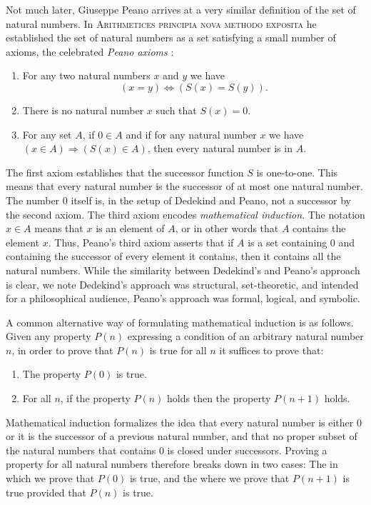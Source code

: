 Not much later, Giuseppe Peano arrives at a very similar definition of the set of natural numbers. In \textsc{Arithmetices principia nova methodo exposita} he established the set of natural numbers as a set satisfying a small number of axioms, the celebrated \emph{Peano axioms} \cite{peano1889}:
\begin{enumerate}
\item For any two natural numbers $x$ and $y$ we have
  \begin{equation*}
    (x=y)\Leftrightarrow (S(x)=S(y)).
  \end{equation*}
\item There is no natural number $x$ such that $S(x)=0$.
\item For any set $A$, if $0\in A$ and if for any natural number $x$ we have $(x\in A) \Rightarrow (S(x)\in A)$, then every natural number is in $A$.
\end{enumerate}
The first axiom establishes that the successor function $S$ is one-to-one. This means that every natural number is the successor of at most one natural number. The number $0$ itself is, in the setup of Dedekind and Peano, not a successor by the second axiom. The third axiom encodes \emph{mathematical induction}. The notation $x\in A$ means that $x$ is an element of $A$, or in other words that $A$ contains the element $x$. Thus, Peano's third axiom asserts that if $A$ is a set containing $0$ and containing the successor of every element it contains, then it contains all the natural numbers. While the similarity between Dedekind's and Peano's approach is clear, we note Dedekind's approach was structural, set-theoretic, and intended for a philosophical audience, Peano's approach was formal, logical, and symbolic.

A common alternative way of formulating mathematical induction is as follows. Given any property $P(n)$ expressing a condition of an arbitrary natural number $n$, in order to prove that $P(n)$ is true for all $n$ it suffices to prove that:
\begin{enumerate}
\item The property $P(0)$ is true.
\item For all $n$, if the property $P(n)$ holds then the property $P(n+1)$ holds.
\end{enumerate}
Mathematical induction formalizes the idea that every natural number is either $0$ or it is the successor of a previous natural number, and that no proper subset of the natural numbers that contains $0$ is closed under successors. Proving a property for all natural numbers therefore breaks down in two cases: The  in which we prove that $P(0)$ is true, and the  where we prove that $P(n+1)$ is true provided that $P(n)$ is true.

